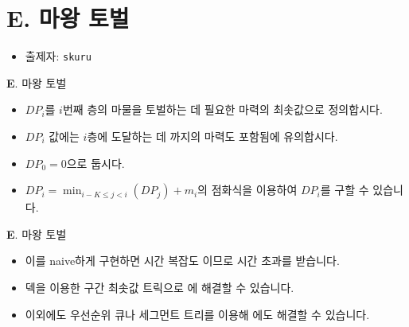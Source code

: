 \section{E. 마왕 토벌}

\begin{frame} %
    \begin{itemize}
        \item 출제자: \texttt{skuru}
    \end{itemize}
\end{frame}

\begin{frame}{\textbf{E}. 마왕 토벌}
    \begin{itemize}
        \item $DP_i$를 $i$번째 층의 마물을 토벌하는 데 필요한 마력의 최솟값으로 정의합시다.
        \item $DP_i$ 값에는 $i$층에 도달하는 데 까지의 마력도 포함됨에 유의합시다.
        \item $DP_0 = 0$으로 둡시다.
        \item $DP_i = \min_{i - K \le j < i}(DP_j) + m_i$의 점화식을 이용하여 $DP_i$를 구할 수 있습니다.
    \end{itemize}
\end{frame}

\begin{frame}{\textbf{E}. 마왕 토벌}
    \begin{itemize}
        \item 이를 naive하게 구현하면 시간 복잡도 이므로 시간 초과를 받습니다.
        \item 덱을 이용한 구간 최솟값 트릭으로 에 해결할 수 있습니다.
        \item 이외에도 우선순위 큐나 세그먼트 트리를 이용해 에도 해결할 수 있습니다.
    \end{itemize}
\end{frame}